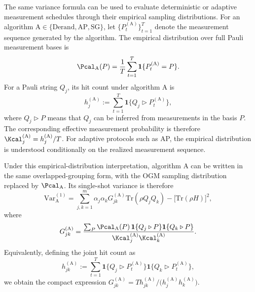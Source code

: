 \documentclass[prl,aps,notitlepage,superscriptaddress,showpacs,nofootinbib]{revtex4-2}
\begin{document}
{{The same variance formula can be used to evaluate deterministic or adaptive measurement schedules through their empirical sampling distributions. 
For an algorithm $\mathrm A\in\{\mathrm{Derand},\mathrm{AP},\mathrm{SG}\}$, let $\{P_t^{(\mathrm A)}\}_{t=1}^{T}$ denote the measurement sequence generated by the algorithm. 
The empirical distribution over full Pauli measurement bases is
\[
    \Pcal_{\mathrm A}(P)
    =
    \frac{1}{T}
    \sum_{t=1}^{T}
    \mathbf 1\{P_t^{(\mathrm A)}=P\}.
\]
For a Pauli string $Q_j$, its hit count under algorithm $\mathrm A$ is
\[
    h_j^{(\mathrm A)}
    :=
    \sum_{t=1}^{T}
    \mathbf 1\{Q_j\triangleright P_t^{(\mathrm A)}\},
\]
where $Q_j\triangleright P$ means that $Q_j$ can be inferred from measurements in the basis $P$. 
The corresponding effective measurement probability is therefore $\Kcal_j^{(\mathrm A)}=h_j^{(\mathrm A)}/T$. 
For adaptive protocols such as AP, the empirical distribution is understood conditionally on the realized measurement sequence.

Under this empirical-distribution interpretation, algorithm $\mathrm A$ can be written in the same overlapped-grouping form, with the OGM sampling distribution replaced by $\Pcal_{\mathrm A}$. 
Its single-shot variance is therefore
\begin{equation}
    \mathrm{Var}_{\mathrm A}^{(1)}
    =
    \sum_{j,k=1}^{m}
    \alpha_j\alpha_k
    G_{jk}^{(\mathrm A)}
    \mathrm{Tr}(\rho Q_jQ_k)
    -
    \bigl[\mathrm{Tr}(\rho H)\bigr]^2,
\end{equation}
where
\[
    G_{jk}^{(\mathrm A)}
    =
    \frac{
    \sum_{P}
    \Pcal_{\mathrm A}(P)\,
    \mathbf 1\{Q_j\triangleright P\}
    \mathbf 1\{Q_k\triangleright P\}
    }{
    \Kcal_j^{(\mathrm A)}\Kcal_k^{(\mathrm A)}
    } .
\]
Equivalently, defining the joint hit count as
\[
    h_{jk}^{(\mathrm A)}
    :=
    \sum_{t=1}^{T}
    \mathbf 1\{Q_j\triangleright P_t^{(\mathrm A)}\}
    \mathbf 1\{Q_k\triangleright P_t^{(\mathrm A)}\},
\]
we obtain the compact expression $G_{jk}^{(\mathrm A)}=T h_{jk}^{(\mathrm A)}/\bigl(h_j^{(\mathrm A)}h_k^{(\mathrm A)}\bigr)$.
}

}
\end{document}

